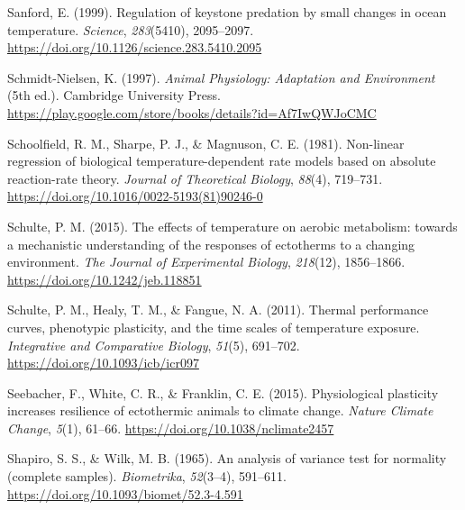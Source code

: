 \documentclass{CSUNthesis}
\begin{document}
\vspace{0.1em}

\vspace{0.1em}

Sanford, E. (1999). Regulation of keystone predation by small changes in ocean temperature. \textit{Science}, \textit{283}(5410), 2095--2097. \url{https://doi.org/10.1126/science.283.5410.2095}

\vspace{0.1em}

Schmidt-Nielsen, K. (1997). \textit{Animal Physiology: Adaptation and Environment} (5th ed.). Cambridge University Press. \url{https://play.google.com/store/books/details?id=Af7IwQWJoCMC}

\vspace{0.1em}

Schoolfield, R. M., Sharpe, P. J., \& Magnuson, C. E. (1981). Non-linear regression of biological temperature-dependent rate models based on absolute reaction-rate theory. \textit{Journal of Theoretical Biology}, \textit{88}(4), 719--731. \url{https://doi.org/10.1016/0022-5193(81)90246-0}

\vspace{0.1em}

Schulte, P. M. (2015). The effects of temperature on aerobic metabolism: towards a mechanistic understanding of the responses of ectotherms to a changing environment. \textit{The Journal of Experimental Biology}, \textit{218}(12), 1856--1866. \url{https://doi.org/10.1242/jeb.118851}

\vspace{0.1em}

Schulte, P. M., Healy, T. M., \& Fangue, N. A. (2011). Thermal performance curves, phenotypic plasticity, and the time scales of temperature exposure. \textit{Integrative and Comparative Biology}, \textit{51}(5), 691--702. \url{https://doi.org/10.1093/icb/icr097}

\vspace{0.1em}

Seebacher, F., White, C. R., \& Franklin, C. E. (2015). Physiological plasticity increases resilience of ectothermic animals to climate change. \textit{Nature Climate Change}, \textit{5}(1), 61--66. \url{https://doi.org/10.1038/nclimate2457}

\vspace{0.1em}

Shapiro, S. S., \& Wilk, M. B. (1965). An analysis of variance test for normality (complete samples). \textit{Biometrika}, \textit{52}(3--4), 591--611. \url{https://doi.org/10.1093/biomet/52.3-4.591}
\end{document}
